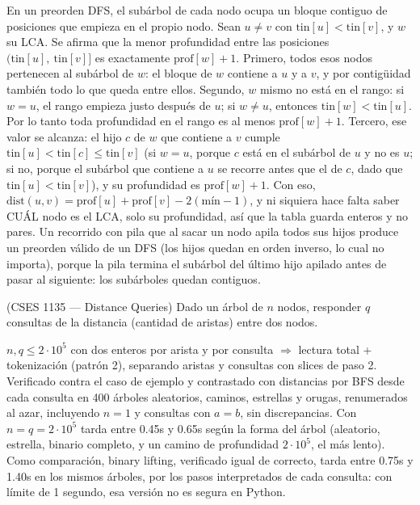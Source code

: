  En un preorden DFS, el subárbol de cada nodo ocupa un bloque contiguo de posiciones que empieza en el propio nodo. Sean $u \ne v$ con $\text{tin}[u] < \text{tin}[v]$, y $w$ su LCA. Se afirma que la menor profundidad entre las posiciones $(\text{tin}[u],\ \text{tin}[v]]$ es exactamente $\text{prof}[w] + 1$. Primero, todos esos nodos pertenecen al subárbol de $w$: el bloque de $w$ contiene a $u$ y a $v$, y por contigüidad también todo lo que queda entre ellos. Segundo, $w$ mismo no está en el rango: si $w = u$, el rango empieza justo después de $u$; si $w \ne u$, entonces $\text{tin}[w] < \text{tin}[u]$. Por lo tanto toda profundidad en el rango es al menos $\text{prof}[w] + 1$. Tercero, ese valor se alcanza: el hijo $c$ de $w$ que contiene a $v$ cumple $\text{tin}[u] < \text{tin}[c] \le \text{tin}[v]$ (si $w = u$, porque $c$ está en el subárbol de $u$ y no es $u$; si no, porque el subárbol que contiene a $u$ se recorre antes que el de $c$, dado que $\text{tin}[u] < \text{tin}[v]$), y su profundidad es $\text{prof}[w] + 1$. Con eso, $\text{dist}(u,v) = \text{prof}[u] + \text{prof}[v] - 2(\text{mín} - 1)$, y ni siquiera hace falta saber CUÁL nodo es el LCA, solo su profundidad, así que la tabla guarda enteros y no pares. Un recorrido con pila que al sacar un nodo apila todos sus hijos produce un preorden válido de un DFS (los hijos quedan en orden inverso, lo cual no importa), porque la pila termina el subárbol del último hijo apilado antes de pasar al siguiente: los subárboles quedan contiguos.~\cite{bender2000}


(CSES 1135 — Distance Queries) Dado un árbol de $n$ nodos, responder $q$ consultas de la distancia (cantidad de aristas) entre dos nodos.

 $n, q \le 2\cdot10^5$ con dos enteros por arista y por consulta $\Rightarrow$ lectura total + tokenización (patrón 2), separando aristas y consultas con slices de paso 2. Verificado contra el caso de ejemplo y contrastado con distancias por BFS desde cada consulta en 400 árboles aleatorios, caminos, estrellas y orugas, renumerados al azar, incluyendo $n = 1$ y consultas con $a = b$, sin discrepancias. Con $n = q = 2\cdot10^5$ tarda entre \aprox{}0.45s y \aprox{}0.65s según la forma del árbol (aleatorio, estrella, binario completo, y un camino de profundidad $2\cdot10^5$, el más lento). Como comparación, binary lifting, verificado igual de correcto, tarda entre \aprox{}0.75s y \aprox{}1.40s en los mismos árboles, por los  pasos interpretados de cada consulta: con límite de 1 segundo, esa versión no es segura en Python.

